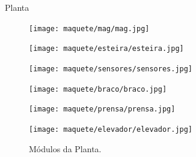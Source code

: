 \begin{frame}{Planta}
   \begin{figure}[ht]
       \begin{minipage}[b]{0.2\linewidth}
         \centering
  \texttt{[image: maquete/mag/mag.jpg]}
       \end{minipage}
       \begin{minipage}[b]{0.2\linewidth}
         \centering
  \texttt{[image: maquete/esteira/esteira.jpg]}
       \end{minipage}
       \begin{minipage}[b]{0.2\linewidth}
         \centering
  \texttt{[image: maquete/sensores/sensores.jpg]}
\end{minipage}

     
       \begin{minipage}[b]{0.2\linewidth}
         \centering
  \texttt{[image: maquete/braco/braco.jpg]}
       \end{minipage}
       \hspace{0.5cm}
       \begin{minipage}[b]{0.2\linewidth}
           \centering
  \texttt{[image: maquete/prensa/prensa.jpg]}
       \end{minipage}
       \begin{minipage}[b]{0.2\linewidth}
           \centering
         \texttt{[image: maquete/elevador/elevador.jpg]}
       \end{minipage}
  \caption{Módulos da Planta.}
   \end{figure}

\end{frame}


